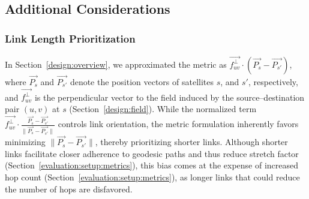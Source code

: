 \documentclass[acmsmall, screen]{acmart}
\begin{document}
\subsection{Additional Considerations}\label{design:considerations}
\subsubsection{Link Length Prioritization}\label{design:considerations:priority}
In Section~\ref{design:overview}, we approximated the metric as $\vec{f^{\perp}_{uv}} \cdot (\vec{P_s} - \vec{P_{s'}})$, where $\vec{P_s}$ and $\vec{P_{s'}}$ denote the position vectors of satellites $s$, and $s'$, respectively, and $\vec{f^{\perp}_{uv}}$ is the perpendicular vector to the field induced by the source–destination pair $(u,v)$ at $s$ (Section~\ref{design:field}). While the normalized term $\vec{f^{\perp}_{uv}} \cdot \frac{\vec{P_s} - \vec{P_{s'}}}{\|\vec{P_s} - \vec{P_{s'}}\|}$ controls link orientation, the metric formulation inherently favors minimizing $\|\vec{P_s} - \vec{P_{s'}}\|$, thereby prioritizing shorter links. Although shorter links facilitate closer adherence to geodesic paths and thus reduce stretch factor (Section~\ref{evaluation:setup:metrics}), this bias comes at the expense of increased hop count (Section~\ref{evaluation:setup:metrics}), as longer links that could reduce the number of hops are disfavored.
\end{document}
